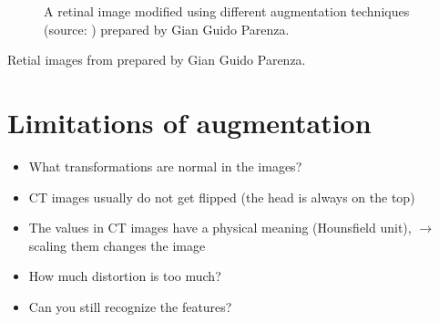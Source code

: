 \documentclass[letterpaper,10pt,english]{sphinxmanual}
\begin{document}
\begin{figure}[htbp]
\centering
\capstart

\noindent{}
\caption{A retinal image modified using different augmentation techniques (source: ) prepared by Gian Guido Parenza.}\label{\detokenize{03-Datasets:id21}}\end{figure}



\sphinxAtStartPar
Retial images from  prepared by Gian Guido Parenza.




\section{Limitations of augmentation}
\label{\detokenize{03-Datasets:limitations-of-augmentation}}\begin{itemize}
\item {} 
\sphinxAtStartPar
What transformations are normal in the images?

\item {} 
\sphinxAtStartPar
CT images usually do not get flipped (the head is always on the top)

\item {} 
\sphinxAtStartPar
The values in CT images have a physical meaning (Hounsfield unit),  \(\rightarrow\) scaling them changes the image

\item {} 
\sphinxAtStartPar
How much distortion is too much?

\item {} 
\sphinxAtStartPar
Can you still recognize the features?

\end{itemize}
\end{document}

